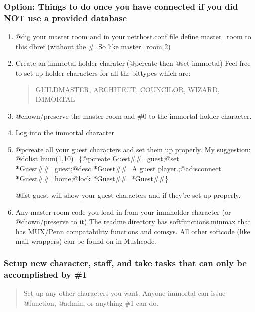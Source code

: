 \documentclass[letterpaper,10pt,english]{sphinxmanual}
\begin{document}
\subsubsection{Option: Things to do once you have connected if you did NOT use a provided database}
\label{\detokenize{installation:option-things-to-do-once-you-have-connected-if-you-did-not-use-a-provided-database}}\begin{enumerate}
%
\item {} 
\sphinxAtStartPar
@dig your master room and in your netrhost.conf file define master\_room
to this dbref (without the \#.  So like master\_room 2)

\item {} 
\sphinxAtStartPar
Create an immortal holder charater (@pcreate then @set immortal)
Feel free to set up holder characters for all the bittypes which are:
\begin{quote}

\sphinxAtStartPar
GUILDMASTER, ARCHITECT, COUNCILOR, WIZARD, IMMORTAL
\end{quote}

\item {} 
\sphinxAtStartPar
@chown/preserve the master room and \#0 to the immortal holder character.

\item {} 
\sphinxAtStartPar
Log into the immortal character

\item {} 
\sphinxAtStartPar
@pcreate all your guest characters and set them up properly.  My suggestion:
@dolist lnum(1,10)=\{@pcreate Guest\#\#=guest;@set {\color{red}\bfseries{}*}Guest\#\#=guest;@desc {\color{red}\bfseries{}*}Guest\#\#=A guest player.;@adisconnect {\color{red}\bfseries{}*}Guest\#\#=home;@lock {\color{red}\bfseries{}*}Guest\#\#=*Guest\#\#\}

\sphinxAtStartPar
@list guest will show your guest characters and if they’re set up properly.

\item {} 
\sphinxAtStartPar
Any master room code you load in from your immholder character (or @chown/preserve to it)
The readme directory has softfunctions.minmax that has MUX/Penn compatability functions and comsys.
All other softcode (like mail wrappers) can be found on  in Mushcode.

\end{enumerate}


\subsubsection{Setup new character, staff, and take tasks that can only be accomplished by \#1}
\label{\detokenize{installation:setup-new-character-staff-and-take-tasks-that-can-only-be-accomplished-by-1}}\begin{quote}

\sphinxAtStartPar
Set up any other characters you want.  Anyone immortal can issue @function, @admin, or anything \#1 can do.
\end{quote}
\end{document}
